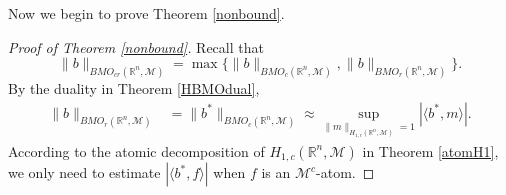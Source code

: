 \documentclass[oneside,english,a4wide]{amsart}
\numberwithin{equation}{section}
\numberwithin{figure}{section}
\theoremstyle{plain}
\theoremstyle{plain}
\theoremstyle{definition}
\theoremstyle{plain}
\theoremstyle{remark}
\theoremstyle{definition}
\theoremstyle{remark}
\theoremstyle{definition}
\newcommand{\8}{\infty}
\begin{document}
Now we begin to prove Theorem \ref{nonbound}.
\begin{proof}[Proof of Theorem \ref{nonbound}]
	Recall that
	\begin{equation*}
		\|b\|_{BMO_{cr}(\mathbb{R}^n,\mathcal{M})}=\max\big\{\|b\|_{BMO_c(\mathbb{R}^n,\mathcal{M})},\|b\|_{BMO_r(\mathbb{R}^n,\mathcal{M})}\big\}.
	\end{equation*}
	By the duality in Theorem \ref{HBMOdual},
	\begin{equation}\label{bbmomh1}
		\begin{aligned}
			\|b\|_{BMO_r(\mathbb{R}^n,\mathcal{M})}{}&=\|b^*\|_{BMO_c(\mathbb{R}^n,\mathcal{M})}\approx\sup_{\|m\|_{H_{1,c}(\mathbb{R}^n,\mathcal{M})}=1}|\langle b^*,m\rangle|.
		\end{aligned}
	\end{equation}
	According to the atomic decomposition of $H_{1,c}(\mathbb{R}^n,\mathcal{M})$ in Theorem \ref{atomH1},
 we only need to estimate $|\langle b^*,f\rangle|$ when $f$ is an $\mathcal{M}^c$-atom.
	

\end{proof}
\end{document}

